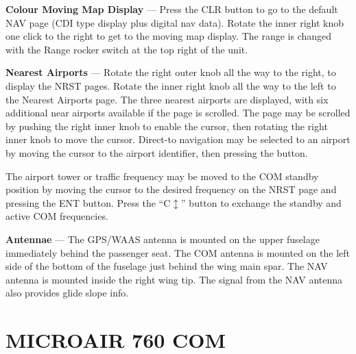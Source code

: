 \textbf{Colour Moving Map Display} --- Press the CLR button to go to the default NAV page (CDI type display plus digital nav data). Rotate the inner right knob one click to the right to get to the moving map display. The range is changed with the Range rocker switch at the top right of the unit.

\textbf{Nearest Airports} --- Rotate the right outer knob all the way to the right, to display the NRST pages. Rotate the inner right knob all the way to the left to the Nearest Airports page. The three nearest airports are displayed, with six additional near airports available if the page is scrolled. The page may be scrolled by pushing the right inner knob to enable the cursor, then rotating the right inner knob to move the cursor. Direct-to navigation may be selected to an airport by moving the cursor to the airport identifier, then pressing the \directto button.

The airport tower or traffic frequency may be moved to the COM standby position by moving the cursor to the desired frequency on the NRST page and pressing the ENT button. Press the ``C$\updownarrow$'' button to exchange the standby and active COM frequencies.

\textbf{Antennae} --- The GPS/WAAS antenna is mounted on the upper fuselage immediately behind the passenger seat. The COM antenna is mounted on the left side of the bottom of the fuselage just behind the wing main spar. The NAV antenna is mounted inside the right wing tip. The signal from the NAV antenna also provides glide slope info.

\section{MICROAIR 760 COM} 


